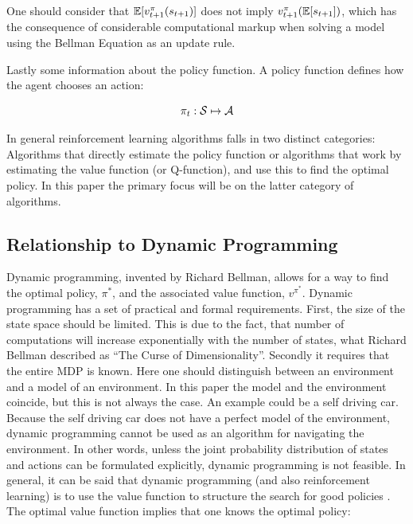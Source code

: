 One should consider that $\mathbb{E} [v_{t+1}^\pi(s_{t+1})]$ does not imply $v_{t+1}^{\pi}(\mathbb{E}[s_{t+1}])$, which has the consequence of considerable computational markup when solving a model using the Bellman Equation as an update rule.

Lastly some information about the policy function.  A policy function defines how the agent chooses an action:

\begin{equation}
    \pi_t : \mathcal{S} \mapsto \mathcal{A} 
\end{equation}

In general reinforcement learning algorithms falls in two distinct categories: Algorithms that directly estimate the policy function or algorithms that work by estimating the value function (or Q-function), and use this to find the optimal policy. In this paper the primary focus will be on the latter category of algorithms.

\subsection{Relationship to Dynamic Programming}\label{sec:dynamic_programming}

Dynamic programming, invented by Richard Bellman, allows for a way to find the optimal policy, $\pi^{*}$, and the associated value function, $v^{\pi^{*}}$. Dynamic programming has a set of practical and formal requirements. First, the size of the state space should be limited. This is due to the fact, that number of computations will increase exponentially with the number of states, what Richard Bellman described as ``The Curse of Dimensionality''. Secondly it requires that the entire MDP is known. Here one should distinguish between an environment and a model of an environment. In this paper the model and the environment coincide, but this is not always the case. An example could be a self driving car. Because the self driving car does not have a perfect model of the environment, dynamic programming cannot be used as an algorithm for navigating the environment. In other words, unless the joint probability distribution of states and actions can be formulated explicitly, dynamic programming is not feasible. In general, it can be said that dynamic programming (and also reinforcement learning) is to use the value function to structure the search for good policies  \parencite{sutton_reinforcement_2018}.  The optimal value function  implies that one knows the optimal policy:

